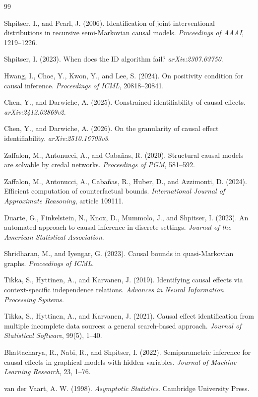 \documentclass{article}
\begin{document}
\begin{thebibliography}{99}

   Shpitser, I., and Pearl, J. (2006). Identification of joint interventional distributions in recursive semi-Markovian causal models. \emph{Proceedings of AAAI}, 1219--1226.

   Shpitser, I. (2023). When does the ID algorithm fail? \emph{arXiv:2307.03750}.

   Hwang, I., Choe, Y., Kwon, Y., and Lee, S. (2024). On positivity condition for causal inference. \emph{Proceedings of ICML}, 20818--20841.

   Chen, Y., and Darwiche, A. (2025). Constrained identifiability of causal effects. \emph{arXiv:2412.02869v2}.

   Chen, Y., and Darwiche, A. (2026). On the granularity of causal effect identifiability. \emph{arXiv:2510.16703v3}.

   Zaffalon, M., Antonucci, A., and Cabañas, R. (2020). Structural causal models are solvable by credal networks. \emph{Proceedings of PGM}, 581--592.

   Zaffalon, M., Antonucci, A., Cabañas, R., Huber, D., and Azzimonti, D. (2024). Efficient computation of counterfactual bounds. \emph{International Journal of Approximate Reasoning}, article 109111.

   Duarte, G., Finkelstein, N., Knox, D., Mummolo, J., and Shpitser, I. (2023). An automated approach to causal inference in discrete settings. \emph{Journal of the American Statistical Association}.

   Shridharan, M., and Iyengar, G. (2023). Causal bounds in quasi-Markovian graphs. \emph{Proceedings of ICML}.

   Tikka, S., Hyttinen, A., and Karvanen, J. (2019). Identifying causal effects via context-specific independence relations. \emph{Advances in Neural Information Processing Systems}.

   Tikka, S., Hyttinen, A., and Karvanen, J. (2021). Causal effect identification from multiple incomplete data sources: a general search-based approach. \emph{Journal of Statistical Software}, 99(5), 1--40.

   Bhattacharya, R., Nabi, R., and Shpitser, I. (2022). Semiparametric inference for causal effects in graphical models with hidden variables. \emph{Journal of Machine Learning Research}, 23, 1--76.

   van der Vaart, A. W. (1998). \emph{Asymptotic Statistics}. Cambridge University Press.

\end{thebibliography}
\end{document}
